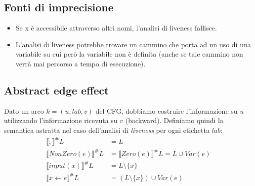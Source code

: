 \documentclass[a4paper,oneside,titlepage]{book}
\begin{document}
\subsection{Fonti di imprecisione}
\begin{itemize}
    \item Se x è accessibile attraverso altri nomi, l'analisi di liveness fallisce.
    \item L'analisi di liveness potrebbe trovare un cammino che porta ad un uso di una variabile su cui però la variabile non è definita (anche se tale cammino non verrà mai percorso a tempo di esecuzione).
\end{itemize}

\subsection{Abstract edge effect}
\label{live3}
Dato un arco $k=(u,lab,v)$ del CFG, dobbiamo costruire l'informazione su $u$ utilizzando l'informazione ricevuta su $v$ (backward). Definiamo quindi la semantica astratta nel caso dell'analisi di \textit{liveness} per ogni etichetta $lab$:
\begin{align*}
    \llbracket ; \rrbracket^\# L &= L \\
    \llbracket NonZero(e) \rrbracket^\# L &= \llbracket Zero(e) \rrbracket^\# L = L \cup Var(e) \\
    \llbracket input(x) \rrbracket^\# L &= L \setminus \{ x \} \\
    \llbracket x \leftarrow e \rrbracket^\# L &= (L \setminus \{ x \}) \cup Var(e)
\end{align*}
\end{document}
